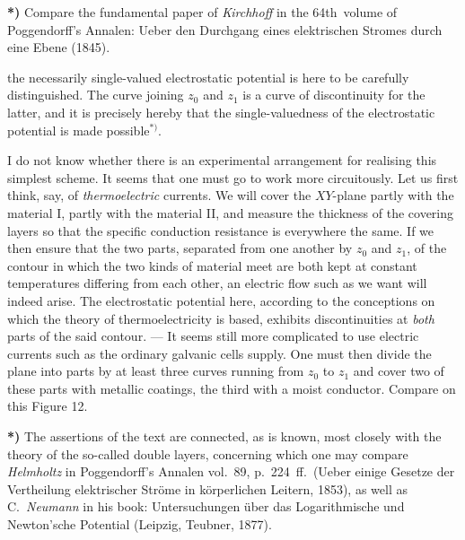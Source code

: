 \documentclass{article}
\begin{document}
\textbf{*)} Compare the fundamental paper of \emph{Kirchhoff} in the 64th\ volume of Poggendorff's Annalen: Ueber den Durchgang eines elektrischen Stromes durch eine Ebene (1845).

the necessarily single-valued electrostatic potential is here to be carefully distinguished. The curve joining $z_{0}$ and $z_{1}$ is a curve of discontinuity for the latter, and it is precisely hereby that the single-valuedness of the electrostatic potential is made possible${}^{*)}$.


I do not know whether there is an experimental arrangement for realising this simplest scheme. It seems that one must go to work more circuitously. Let us first think, say, of \emph{thermoelectric} currents. We will cover the $XY$-plane partly with the material I, partly with the material II, and measure the thickness of the covering layers so that the specific conduction resistance is everywhere the same. If we then ensure that the two parts, separated from one another by $z_{0}$ and $z_{1}$, of the contour in which the two kinds of material meet are both kept at constant temperatures differing from each other, an electric flow such as we want will indeed arise. The electrostatic potential here, according to the conceptions on which the theory of thermoelectricity is based, exhibits discontinuities at \emph{both} parts of the said contour. --- It seems still more complicated to use electric currents such as the ordinary galvanic cells supply. One must then divide the plane into parts by at least three curves running from $z_{0}$ to $z_{1}$ and cover two of these parts with metallic coatings, the third with a moist conductor. Compare on this Figure 12.

\textbf{*)} The assertions of the text are connected, as is known, most closely with the theory of the so-called double layers, concerning which one may compare \emph{Helmholtz} in Poggendorff's Annalen vol.~89, p.~224~ff.\ (Ueber einige Gesetze der Vertheilung elektrischer Ströme in körperlichen Leitern, 1853), as well as C.\ \emph{Neumann} in his book: Untersuchungen über das Logarithmische und Newton'sche Potential (Leipzig, Teubner, 1877).


\end{document}
